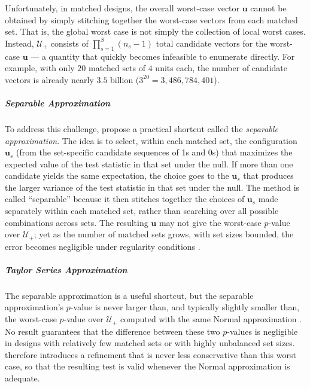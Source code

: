 \documentclass[twoside,11pt]{article}
\begin{document}
Unfortunately, in matched designs, the overall worst-case vector
\(\bm{u}\) cannot be obtained by simply stitching together the
worst-case vectors from each matched set. That is, the global worst case
is not simply the collection of local worst cases. Instead,
\(\mathcal{U}_{+}\) consists of \(\prod_{s = 1}^S (n_s - 1)\) total
candidate vectors for the worst-case \(\bm{u}\) \citep[p.~496]{rosenbaumkrieger1990} --- a quantity that
quickly becomes infeasible to enumerate directly. For example, with only
\(20\) matched sets of \(4\) units each, the number of candidate vectors
is already nearly \(3.5\) billion (\(3^{20} = 3{,}486{,}784{,}401\)).

\subparagraph{Separable Approximation}\label{separable-approximation}

To address this challenge, \citet{gastwirthetal2000} propose a practical
shortcut called the \emph{separable approximation}. The idea is to
select, within each matched set, the configuration \(\bm{u}_s\) (from
the set-specific candidate sequences of 1s and 0s) that maximizes the
expected value of the test statistic in that set under the null. If more
than one candidate yields the same expectation, the choice goes to the
\(\bm{u}_s\) that produces the larger variance of the test statistic in
that set under the null. The method is called ``separable'' because it
then stitches together the choices of \(\bm{u}_s\) made separately
within each matched set, rather than searching over all possible
combinations across sets. The resulting \(\bm{u}\) may not give the
worst-case \(p\)-value over \(\mathcal{U}_{+}\); yet as the number of matched sets grows,
with set sizes bounded, the error becomes negligible under regularity
conditions \citep[Proposition~1]{gastwirthetal2000}.

\subparagraph{Taylor Series
Approximation}\label{taylor-series-approximation}

The separable approximation is a useful shortcut, but the separable
approximation's \(p\)-value is never larger than, and typically slightly
smaller than, the worst-case \(p\)-value over \(\mathcal{U}_{+}\) computed
with the same Normal approximation \citep[pp.~2321--2322]{rosenbaum2018}. No
result guarantees that the difference between these two \(p\)-values is
negligible in designs with relatively few matched sets or with highly
unbalanced set sizes. \citet{rosenbaum2018} therefore introduces a
refinement that is never less conservative than this worst case, so that
the resulting test is valid whenever the Normal approximation is
adequate.
\end{document}
